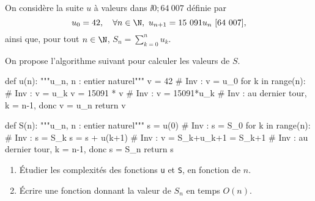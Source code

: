   On considère la suite $u$ à valeurs dans $\ii{0;64~007}$ définie par 
  \begin{equation*}
    u_0 = 42,\quad \forall n \in\N,~ u_{n+1} = 15~091 u_n ~[64~007], 
  \end{equation*}
  ainsi que, pour tout $n\in\N$, $S_n = \displaystyle\sum_{k=0}^n u_k$.
  
  On propose l'algorithme suivant pour calculer les valeurs de $S$. 
\begin{pyverbatim}
def u(n):
    """u_n, n : entier naturel"""
    v = 42
    # Inv : v = u_0
    for k in range(n):
        # Inv : v = u_k
        v = 15091 * v %
        # Inv : v = 15091*u_k %
    # Inv : au dernier tour, k = n-1, donc v = u_n
    return v
    
def S(n):
    """u_n, n : entier naturel"""
    s = u(0)
    # Inv : s = S_0
    for k in range(n):
        # Inv : s = S_k
        s = s + u(k+1)
        # Inv : v = S_k+u_k+1 = S_k+1
    # Inv : au dernier tour, k = n-1, donc s = S_n
    return s
\end{pyverbatim}
\begin{enumerate}
  \item Étudier les complexités des fonctions \texttt{u} et \texttt{S}, en fonction de $n$.
  \item Écrire une fonction donnant la valeur de $S_n$ en temps $O(n)$. 
\end{enumerate}